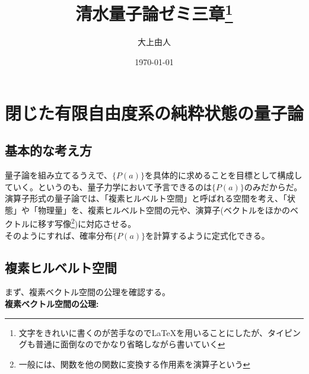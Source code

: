 \documentclass[a4paper,11pt]{jsarticle}
\begin{document}
\title{清水量子論ゼミ三章\footnote{文字をきれいに書くのが苦手なので\LaTeX を用いることにしたが、タイピングも普通に面倒なのでかなり省略しながら書いていく}}
\author{大上由人}
\date{\today}
\maketitle

\section{閉じた有限自由度系の純粋状態の量子論}


\subsection{基本的な考え方}
量子論を組み立てるうえで、$\{P(a)\}$を具体的に求めることを目標として構成していく。というのも、量子力学において予言できるのは$\{P(a)\}$のみだからだ。\\
演算子形式の量子論では、「複素ヒルベルト空間」と呼ばれる空間を考え、「状態」や「物理量」を、複素ヒルベルト空間の元や、演算子(ベクトルをほかのベクトルに移す写像\footnote{一般には、関数を他の関数に変換する作用素を演算子という})に対応させる。\\
そのようにすれば、確率分布$\{P(a)\}$を計算するように定式化できる。

\subsection{複素ヒルベルト空間}
まず、複素ベクトル空間の公理を確認する。\\
\textbf{複素ベクトル空間の公理:}
\end{document}
